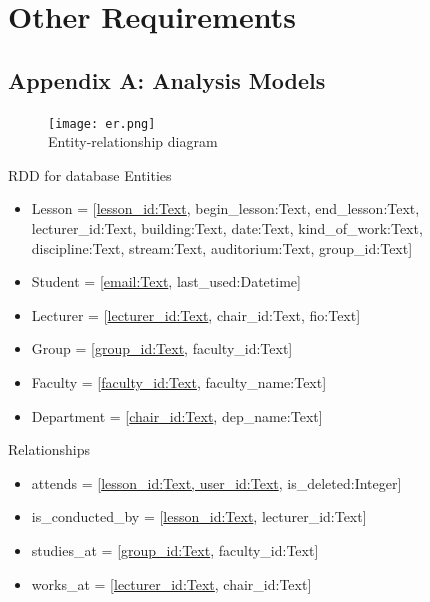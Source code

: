 \documentclass{scrreprt}
\begin{document}
\chapter{Other Requirements}

\section{Appendix A: Analysis Models}
\begin{figure}[h]
\center
{\texttt{[image: er.png]} \\Entity-relationship diagram}
\end{figure}

RDD for database
Entities
\begin{itemize}
\item Lesson = {[\underline{lesson_id:Text}, begin_lesson:Text, end_lesson:Text, lecturer_id:Text, building:Text, date:Text, kind_of_work:Text, discipline:Text, stream:Text, auditorium:Text, group_id:Text]} 
\item Student = {[\underline{email:Text}, last_used:Datetime]}
\item Lecturer = {[\underline{lecturer_id:Text}, chair_id:Text, fio:Text]}
\item Group = {[\underline{group_id:Text}, faculty_id:Text]}
\item Faculty = {[\underline{faculty_id:Text}, faculty_name:Text]}  
\item Department = {[\underline{chair_id:Text}, dep_name:Text]}  
\end{itemize}

Relationships
\begin{itemize}
\item attends = {[\underline{lesson_id:Text, user_id:Text}, is_deleted:Integer]}
\item is_conducted_by = {[\underline{lesson_id:Text}, lecturer_id:Text]}
\item studies_at = {[\underline{group_id:Text}, faculty_id:Text]}
\item works_at = {[\underline{lecturer_id:Text}, chair_id:Text]}
\end{itemize}
\end{document}
